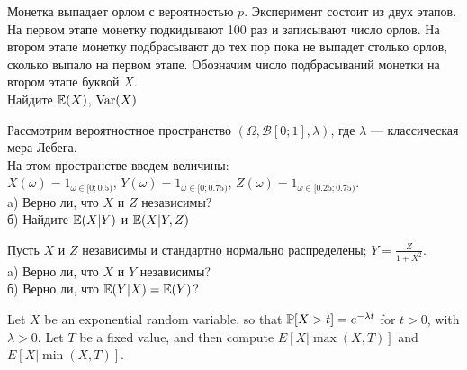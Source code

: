 \begin{problem}
Монетка выпадает орлом с вероятностью $p$. Эксперимент состоит из двух этапов. На первом этапе монетку подкидывают 100 раз и записывают число орлов. На втором этапе монетку подбрасывают до тех пор пока не выпадет столько орлов, сколько выпало на первом этапе. Обозначим число подбрасываний монетки на втором этапе буквой $X$. \\
Найдите $\E(X)$, $\Var(X)$

\begin{sol}

\end{sol}
\end{problem}

\begin{problem}
Рассмотрим вероятностное пространство
$(\Omega,\mathcal{B}[0;1],\lambda)$, где $\lambda$ — классическая
мера Лебега.\\
На этом пространстве введем величины: \\
$X(\omega)=1_{\omega\in[0;0.5)}$,
$Y(\omega)=1_{\omega\in[0;0.75)}$,
$Z(\omega)=1_{\omega\in[0.25;0.75)}$. \\
a) Верно ли, что $X$ и $Z$ независимы? \\
б) Найдите $\E(X|Y)$ и $\E(X|Y,Z)$

\begin{sol}

\end{sol}
\end{problem}

\begin{problem}
Пусть $X$ и $Z$ независимы и стандартно нормально распределены;
$Y=\frac{Z}{1+X^{2}}$. \\
a) Верно ли, что $X$ и $Y$ независимы? \\
б) Верно ли, что $\E(Y|X)=\E(Y)$?

\begin{sol}

\end{sol}
\end{problem}

\begin{problem}
 Let $X$ be an exponential random variable, so that $\P[X > t] = e^{-\lambda t}$
	for $t > 0$, with $\lambda > 0$. 	Let $T$ be a fixed value, and then compute
	$E[ X | \max(X,T) ]$ and $E[X | \min(X,T)]$.

\begin{sol}

\end{sol}
\end{problem}

